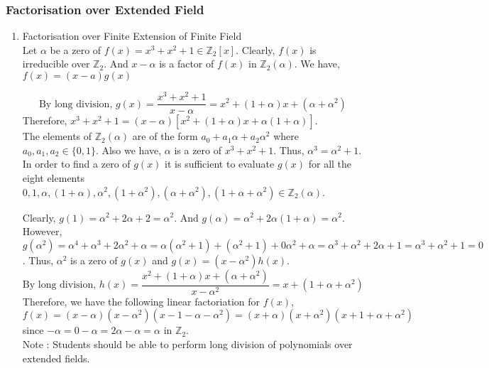 \subsubsection{Factorisation over Extended Field}
\begin{enumerate}
	\item Factorisation over Finite Extension of Finite Field \cite[Exercise 29.25]{fraleigh}\\
		Let $\alpha$ be a zero of $f(x) = x^3+x^2+1 \in \mathbb{Z}_2[x]$.
		Clearly, $f(x)$ is irreducible over $\mathbb{Z}_2$.
		And $x-\alpha$ is a factor of $f(x)$ in $\mathbb{Z}_2(\alpha)$. We have, $f(x) = (x-a)g(x)$

		\[\text{By long division, } g(x) = \frac{x^3+x^2+1}{x-\alpha} = x^2+(1+\alpha)x+(\alpha+\alpha^2)\]
		Therefore, $x^3+x^2+1 = (x-\alpha)[x^2+(1+\alpha)x+\alpha(1+\alpha)]$.\\

		The elements of $\mathbb{Z}_2(\alpha)$ are of the form $a_0+a_1\alpha+a_2\alpha^2$ where $a_0,a_1,a_2 \in \{0,1\}$.
		Also we have, $\alpha$ is a zero of $x^3+x^2+1$.
		Thus, $\alpha^3 = \alpha^2+1$.\\

		In order to find a zero of $g(x)$ it is sufficient to evaluate $g(x)$ for all the eight elements $ 0, 1, \alpha, (1+\alpha), \alpha^2, (1+\alpha^2),(\alpha+\alpha^2), (1+\alpha+\alpha^2) \in \mathbb{Z}_2(\alpha)$.
		
		Clearly, $g(1) = \alpha^2+2\alpha+2 = \alpha^2$.
		And $g(\alpha) = \alpha^2 + 2\alpha(1+\alpha) = \alpha^2$.
		However, $g(\alpha^2) = \alpha^4+\alpha^3+2\alpha^2+\alpha = \alpha(\alpha^2+1)+(\alpha^2+1) + 0\alpha^2 + \alpha = \alpha^3 + \alpha^2 + 2\alpha + 1 = \alpha^3+\alpha^2+1 = 0$.
		Thus, $\alpha^2$ is a zero of $g(x)$ and $g(x) = (x-\alpha^2)h(x)$.
		\[\text{By long division, } h(x) = \frac{x^2+(1+\alpha)x+(\alpha+\alpha^2)}{x-\alpha^2} = x+(1+\alpha+\alpha^2)\]
		Therefore, we have the following linear factoriation for $f(x)$,\\ $f(x) = (x-\alpha)(x-\alpha^2)(x-1-\alpha-\alpha^2) = (x+\alpha)(x+\alpha^2)(x+1+\alpha+\alpha^2)$ since $-\alpha = 0-\alpha = 2\alpha-\alpha = \alpha$ in $\mathbb{Z}_2$.\\

	Note : Students should be able to perform long division of polynomials over extended fields.
\end{enumerate}

